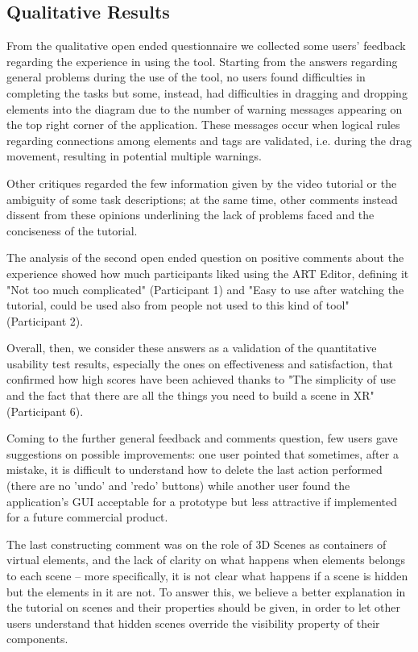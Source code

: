 \subsection{Qualitative Results}
From the qualitative open ended questionnaire we collected some users' feedback regarding the experience in using the tool. Starting from the answers regarding general problems during the use of the tool, no users found difficulties in completing the tasks but some, instead, had difficulties in dragging and dropping elements into the diagram due to the number of warning messages appearing on the top right corner of the application. These messages occur when logical rules regarding connections among elements and tags are validated, i.e. during the drag movement, resulting in potential multiple warnings. 

Other critiques regarded the few information given by the video tutorial or the ambiguity of some task descriptions; at the same time, other comments instead dissent from these opinions underlining the lack of problems faced and the conciseness of the tutorial.

The analysis of the second open ended question on positive comments about the experience showed how much participants liked using the ART Editor, defining it "Not too much complicated" (Participant 1) and "Easy to use after watching the tutorial, could be used also from people not used to this kind of tool" (Participant 2). 

Overall, then, we consider these answers as a validation of the quantitative usability test results, especially the ones on effectiveness and satisfaction, that confirmed how high scores have been achieved thanks to "The simplicity of use and the fact that there are all the things you need to build a scene in XR" (Participant 6).

Coming to the further general feedback and comments question, few users gave suggestions on possible improvements: one user pointed that sometimes, after a mistake, it is difficult to understand how to delete the last action performed (there are no 'undo' and 'redo' buttons) while another user found the application's \gls{GUI} acceptable for a prototype but less attractive if implemented for a future commercial product. 

The last constructing comment was on the role of 3D Scenes as containers of virtual elements, and the lack of clarity on what happens when elements belongs to each scene -- more specifically, it is not clear what happens if a scene is hidden but the elements in it are not. To answer this, we believe a better explanation in the tutorial on scenes and their properties should be given, in order to let other users understand that hidden scenes override the visibility property of their components.

